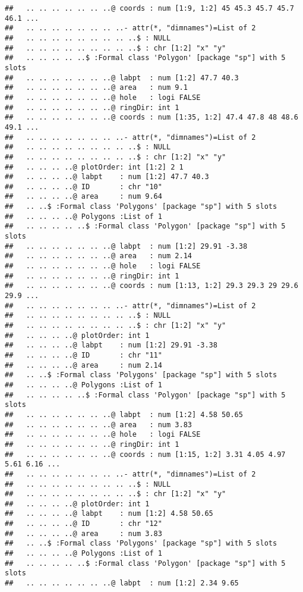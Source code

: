 \documentclass[]{article}
\begin{document}
\begin{verbatim}
##   .. .. .. .. .. .. ..@ coords : num [1:9, 1:2] 45 45.3 45.7 45.7 46.1 ...
##   .. .. .. .. .. .. .. ..- attr(*, "dimnames")=List of 2
##   .. .. .. .. .. .. .. .. ..$ : NULL
##   .. .. .. .. .. .. .. .. ..$ : chr [1:2] "x" "y"
##   .. .. .. .. ..$ :Formal class 'Polygon' [package "sp"] with 5 slots
##   .. .. .. .. .. .. ..@ labpt  : num [1:2] 47.7 40.3
##   .. .. .. .. .. .. ..@ area   : num 9.1
##   .. .. .. .. .. .. ..@ hole   : logi FALSE
##   .. .. .. .. .. .. ..@ ringDir: int 1
##   .. .. .. .. .. .. ..@ coords : num [1:35, 1:2] 47.4 47.8 48 48.6 49.1 ...
##   .. .. .. .. .. .. .. ..- attr(*, "dimnames")=List of 2
##   .. .. .. .. .. .. .. .. ..$ : NULL
##   .. .. .. .. .. .. .. .. ..$ : chr [1:2] "x" "y"
##   .. .. .. ..@ plotOrder: int [1:2] 2 1
##   .. .. .. ..@ labpt    : num [1:2] 47.7 40.3
##   .. .. .. ..@ ID       : chr "10"
##   .. .. .. ..@ area     : num 9.64
##   .. ..$ :Formal class 'Polygons' [package "sp"] with 5 slots
##   .. .. .. ..@ Polygons :List of 1
##   .. .. .. .. ..$ :Formal class 'Polygon' [package "sp"] with 5 slots
##   .. .. .. .. .. .. ..@ labpt  : num [1:2] 29.91 -3.38
##   .. .. .. .. .. .. ..@ area   : num 2.14
##   .. .. .. .. .. .. ..@ hole   : logi FALSE
##   .. .. .. .. .. .. ..@ ringDir: int 1
##   .. .. .. .. .. .. ..@ coords : num [1:13, 1:2] 29.3 29.3 29 29.6 29.9 ...
##   .. .. .. .. .. .. .. ..- attr(*, "dimnames")=List of 2
##   .. .. .. .. .. .. .. .. ..$ : NULL
##   .. .. .. .. .. .. .. .. ..$ : chr [1:2] "x" "y"
##   .. .. .. ..@ plotOrder: int 1
##   .. .. .. ..@ labpt    : num [1:2] 29.91 -3.38
##   .. .. .. ..@ ID       : chr "11"
##   .. .. .. ..@ area     : num 2.14
##   .. ..$ :Formal class 'Polygons' [package "sp"] with 5 slots
##   .. .. .. ..@ Polygons :List of 1
##   .. .. .. .. ..$ :Formal class 'Polygon' [package "sp"] with 5 slots
##   .. .. .. .. .. .. ..@ labpt  : num [1:2] 4.58 50.65
##   .. .. .. .. .. .. ..@ area   : num 3.83
##   .. .. .. .. .. .. ..@ hole   : logi FALSE
##   .. .. .. .. .. .. ..@ ringDir: int 1
##   .. .. .. .. .. .. ..@ coords : num [1:15, 1:2] 3.31 4.05 4.97 5.61 6.16 ...
##   .. .. .. .. .. .. .. ..- attr(*, "dimnames")=List of 2
##   .. .. .. .. .. .. .. .. ..$ : NULL
##   .. .. .. .. .. .. .. .. ..$ : chr [1:2] "x" "y"
##   .. .. .. ..@ plotOrder: int 1
##   .. .. .. ..@ labpt    : num [1:2] 4.58 50.65
##   .. .. .. ..@ ID       : chr "12"
##   .. .. .. ..@ area     : num 3.83
##   .. ..$ :Formal class 'Polygons' [package "sp"] with 5 slots
##   .. .. .. ..@ Polygons :List of 1
##   .. .. .. .. ..$ :Formal class 'Polygon' [package "sp"] with 5 slots
##   .. .. .. .. .. .. ..@ labpt  : num [1:2] 2.34 9.65

\end{verbatim}
\end{document}
